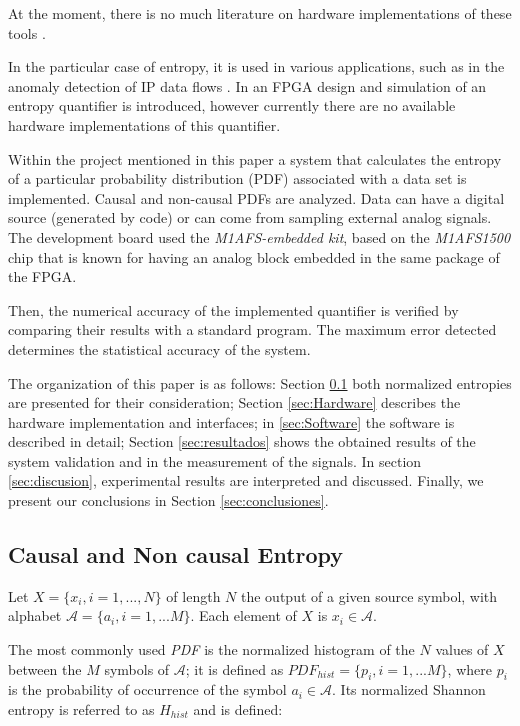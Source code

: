 At the moment, there is no much literature on hardware implementations of these tools \cite{DeMicco2013}.

In the particular case of entropy, it is used in various applications, such as in the anomaly detection of IP data flows \cite{Gu2005, Wagner2006}. In \cite{Subramanya2008} an FPGA design and simulation of an entropy quantifier is introduced, however currently there are no available hardware implementations of this quantifier.

Within the project mentioned in this paper a system that calculates the entropy of a particular probability distribution (PDF) associated with a data set is implemented. Causal and non-causal PDFs are analyzed. Data can have a digital source (generated by code) or can come from sampling external analog signals. The development board used the \textit{M1AFS-embedded kit}, based on the \textit{M1AFS1500} chip that is known for having an analog block embedded in the same package of the FPGA.

Then, the numerical accuracy of the implemented quantifier is verified  by comparing their results with a standard program. The maximum error detected determines the statistical accuracy of the system.

The organization of this paper is as follows: Section \ref{sec:entropias} both normalized entropies are presented for their consideration; Section \ref{sec:Hardware} describes the hardware implementation and interfaces; in \ref{sec:Software} the software is described in detail; Section \ref{sec:resultados} shows the obtained results of the system validation and in the measurement of the signals. In section \ref{sec:discusion}, experimental results are interpreted and discussed. Finally, we present our conclusions in Section \ref{sec:conclusiones}.

\subsection{Causal and Non causal Entropy}
\label{sec:entropias}
Let $X=\{x_i, i=1,...,N\}$ of length $N$ the output of a given source symbol, 
with alphabet $\mathcal{A}=\{a_i,i=1,...M\}$. Each element of $X$ is $x_i \in \mathcal{A}$.

The most commonly used \emph{PDF} is the normalized histogram of the $N$ values of $X$ between the $M$ symbols of $\mathcal{A}$; it is defined as $PDF_{hist}=\{p_i,i=1,...M\}$, where $p_i$ 
is the probability of occurrence of the symbol $a_i \in \mathcal{A}$. Its normalized Shannon entropy is referred to as   $H_{hist}$ and is defined:


